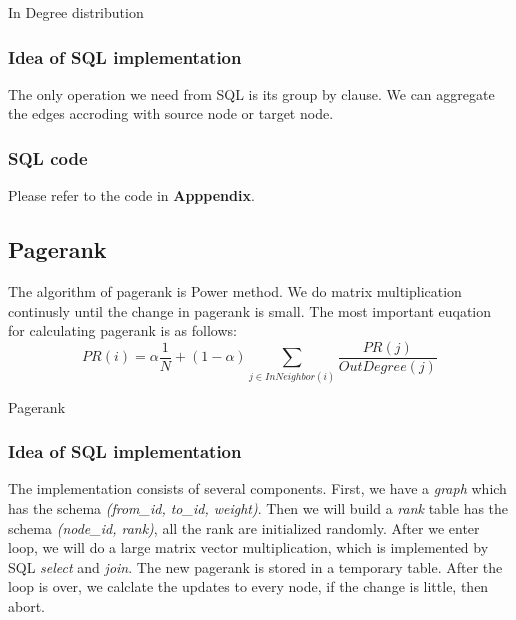 \begin{algorithm}
\caption{In Degree distribution}
\begin{algorithmic}
\end{algorithmic}
\label{algo1:2}
\end{algorithm}

\subsubsection{Idea of SQL implementation}
The only operation we need from SQL is its group by clause. We can aggregate the edges accroding with source node or target node.

\subsubsection{SQL code}
Please refer to the code in {\bf Apppendix}.

\subsection{Pagerank}
The algorithm of pagerank is Power method. We do matrix multiplication continusly until the change in pagerank is small. The most important euqation for calculating pagerank is as follows:
\begin{equation}
  PR(i) = \alpha \frac{1}{N} + (1 - \alpha) \sum_{j \in InNeighbor(i)} \frac{PR(j)}{OutDegree(j)}
\end{equation}
\begin{algorithm}
\caption{Pagerank}
\begin{algorithmic}
\REPEAT
{}
\end{algorithmic}
\end{algorithm}

\subsubsection{Idea of SQL implementation}
The implementation consists of several components.
First, we have a \emph{graph} which has the schema \emph{(from\_id, to\_id, weight)}. Then we will build a \emph{rank} table has the schema \emph{(node\_id, rank)}, all the rank are initialized randomly. After we enter loop, we will do a large matrix vector multiplication, which is implemented by SQL \emph{select} and \emph{join}. The new pagerank is stored in a temporary table. After the loop is over, we calclate the updates to every node, if the change is little, then abort.

